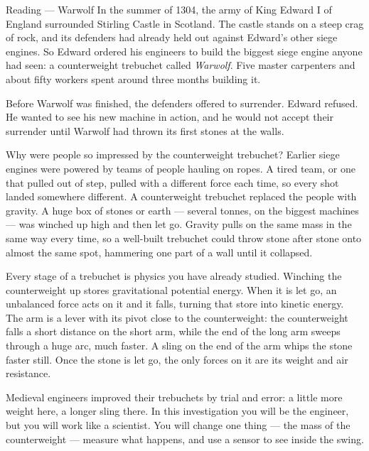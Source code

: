\documentclass[11pt,a4paper]{article}
\begin{document}
\begin{readingbox}{Reading --- Warwolf}
\setlength{\parskip}{5pt}
In the summer of 1304, the army of King Edward I of England surrounded Stirling Castle in Scotland. The castle stands on a steep crag of rock, and its defenders had already held out against Edward's other siege engines. So Edward ordered his engineers to build the biggest siege engine anyone had seen: a counterweight trebuchet called \emph{Warwolf}. Five master carpenters and about fifty workers spent around three months building it.

Before Warwolf was finished, the defenders offered to surrender. Edward refused. He wanted to see his new machine in action, and he would not accept their surrender until Warwolf had thrown its first stones at the walls.

Why were people so impressed by the counterweight trebuchet? Earlier siege engines were powered by teams of people hauling on ropes. A tired team, or one that pulled out of step, pulled with a different force each time, so every shot landed somewhere different. A counterweight trebuchet replaced the people with gravity. A huge box of stones or earth --- several tonnes, on the biggest machines --- was winched up high and then let go. Gravity pulls on the same mass in the same way every time, so a well-built trebuchet could throw stone after stone onto almost the same spot, hammering one part of a wall until it collapsed.

Every stage of a trebuchet is physics you have already studied. Winching the counterweight up stores gravitational potential energy. When it is let go, an unbalanced force acts on it and it falls, turning that store into kinetic energy. The arm is a lever with its pivot close to the counterweight: the counterweight falls a short distance on the short arm, while the end of the long arm sweeps through a huge arc, much faster. A sling on the end of the arm whips the stone faster still. Once the stone is let go, the only forces on it are its weight and air resistance.

Medieval engineers improved their trebuchets by trial and error: a little more weight here, a longer sling there. In this investigation you will be the engineer, but you will work like a scientist. You will change one thing --- the mass of the counterweight --- measure what happens, and use a sensor to see inside the swing.
\end{readingbox}
\end{document}
